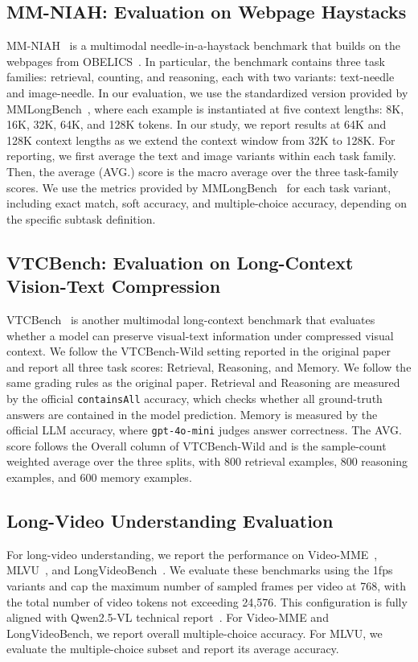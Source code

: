 {{\subsection{MM-NIAH: Evaluation on Webpage Haystacks}
\label{app:evaluation_details:mm_niah}
MM-NIAH~\citep{wang2024needle} is a multimodal needle-in-a-haystack benchmark that builds on the webpages from OBELICS~\citep{laurenccon2023obelics}.
In particular, the benchmark contains three task families: retrieval, counting, and reasoning, each with two variants: text-needle and image-needle.
In our evaluation, we use the standardized version provided by MMLongBench~\citep{wang2025mmlongbench}, where each example is instantiated at five context lengths: 8K, 16K, 32K, 64K, and 128K tokens.
In our study, we report results at 64K and 128K context lengths as we extend the context window from 32K to 128K.
For reporting, we first average the text and image variants within each task family.
Then, the average (AVG.) score is the macro average over the three task-family scores.
We use the metrics provided by MMLongBench~\citep{wang2025mmlongbench} for each task variant, including exact match, soft accuracy, and multiple-choice accuracy, depending on the specific subtask definition.

\subsection{VTCBench: Evaluation on Long-Context Vision-Text Compression}
\label{app:evaluation_details:vtcbench}
VTCBench~\citep{zhao2025vtcbench} is another multimodal long-context benchmark that evaluates whether a model can preserve visual-text information under compressed visual context.
We follow the VTCBench-Wild setting reported in the original paper and report all three task scores: Retrieval, Reasoning, and Memory.
We follow the same grading rules as the original paper.
Retrieval and Reasoning are measured by the official \texttt{containsAll} accuracy, which checks whether all ground-truth answers are contained in the model prediction.
Memory is measured by the official LLM accuracy, where \texttt{gpt-4o-mini} judges answer correctness.
The AVG. score follows the Overall column of VTCBench-Wild and is the sample-count weighted average over the three splits, with 800 retrieval examples, 800 reasoning examples, and 600 memory examples.

\subsection{Long-Video Understanding Evaluation}
\label{app:evaluation_details:video}
For long-video understanding, we report the performance on Video-MME~\citep{fu2025video}, MLVU~\citep{zhou2025mlvu}, and LongVideoBench~\citep{wu2024longvideobench}.
We evaluate these benchmarks using the 1fps variants and cap the maximum number of sampled frames per video at 768, with the total number of video tokens not exceeding 24,576.
This configuration is fully aligned with Qwen2.5-VL technical report~\citep{bai2025qwen2}.
For Video-MME and LongVideoBench, we report overall multiple-choice accuracy.
For MLVU, we evaluate the multiple-choice subset and report its average accuracy.

}}

